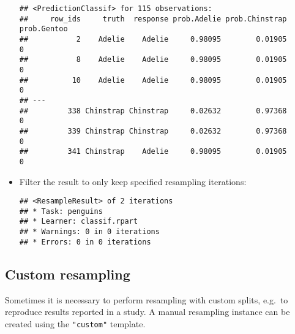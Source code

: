 \documentclass[
]{scrbook}
\newenvironment{Shaded}{\begin{snugshade}}{\end{snugshade}}
\newcommand{\CommentTok}[1]{\textcolor[rgb]{0.56,0.35,0.01}{\textit{#1}}}
\newcommand{\DecValTok}[1]{\textcolor[rgb]{0.00,0.00,0.81}{#1}}
\newcommand{\FunctionTok}[1]{\textcolor[rgb]{0.00,0.00,0.00}{#1}}
\newcommand{\NormalTok}[1]{#1}
\newcommand{\SpecialCharTok}[1]{\textcolor[rgb]{0.00,0.00,0.00}{#1}}
\renewenvironment{Shaded} {\begin{snugshade}\small} {\end{snugshade}}
\begin{document}
\begin{itemize}
\begin{Shaded}
\end{Shaded}

\begin{verbatim}
## <PredictionClassif> for 115 observations:
##     row_ids     truth  response prob.Adelie prob.Chinstrap prob.Gentoo
##           2    Adelie    Adelie     0.98095        0.01905           0
##           8    Adelie    Adelie     0.98095        0.01905           0
##          10    Adelie    Adelie     0.98095        0.01905           0
## ---                                                                   
##         338 Chinstrap Chinstrap     0.02632        0.97368           0
##         339 Chinstrap Chinstrap     0.02632        0.97368           0
##         341 Chinstrap    Adelie     0.98095        0.01905           0
\end{verbatim}
\item
  Filter the result to only keep specified resampling iterations:

\begin{Shaded}
\end{Shaded}

\begin{verbatim}
## <ResampleResult> of 2 iterations
## * Task: penguins
## * Learner: classif.rpart
## * Warnings: 0 in 0 iterations
## * Errors: 0 in 0 iterations
\end{verbatim}
\end{itemize}

\hypertarget{resamp-custom}{%
\subsection{Custom resampling}\label{resamp-custom}}

Sometimes it is necessary to perform resampling with custom splits, e.g.~to reproduce results reported in a study.
A manual resampling instance can be created using the \texttt{"custom"} template.
\end{document}
